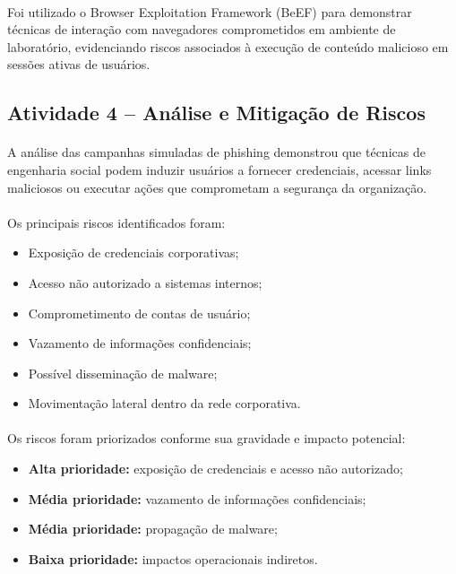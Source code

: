 \paragraph{}
Foi utilizado o Browser Exploitation Framework (BeEF) para demonstrar técnicas
de interação com navegadores comprometidos em ambiente de laboratório,
evidenciando riscos associados à execução de conteúdo malicioso em sessões
ativas de usuários.

\subsection{Atividade 4 -- Análise e Mitigação de Riscos}

\paragraph{}
A análise das campanhas simuladas de phishing demonstrou que técnicas de
engenharia social podem induzir usuários a fornecer credenciais, acessar links
maliciosos ou executar ações que comprometam a segurança da organização.

\paragraph{}
Os principais riscos identificados foram:

\begin{itemize}
    \item Exposição de credenciais corporativas;
    \item Acesso não autorizado a sistemas internos;
    \item Comprometimento de contas de usuário;
    \item Vazamento de informações confidenciais;
    \item Possível disseminação de malware;
    \item Movimentação lateral dentro da rede corporativa.
\end{itemize}

\paragraph{}
Os riscos foram priorizados conforme sua gravidade e impacto potencial:

\begin{itemize}
    \item \textbf{Alta prioridade:} exposição de credenciais e acesso não
      autorizado;
    \item \textbf{Média prioridade:} vazamento de informações confidenciais;
    \item \textbf{Média prioridade:} propagação de malware;
    \item \textbf{Baixa prioridade:} impactos operacionais indiretos.
\end{itemize}

